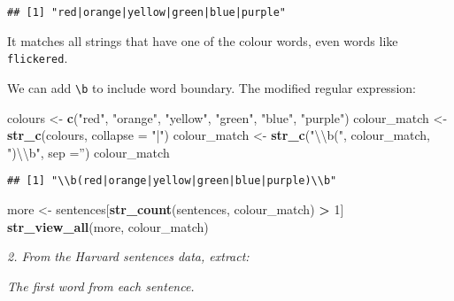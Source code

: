 \documentclass[]{article}
\newenvironment{Shaded}{\begin{snugshade}}{\end{snugshade}}
\newcommand{\KeywordTok}[1]{\textcolor[rgb]{0.13,0.29,0.53}{\textbf{#1}}}
\newcommand{\DataTypeTok}[1]{\textcolor[rgb]{0.13,0.29,0.53}{#1}}
\newcommand{\DecValTok}[1]{\textcolor[rgb]{0.00,0.00,0.81}{#1}}
\newcommand{\CharTok}[1]{\textcolor[rgb]{0.31,0.60,0.02}{#1}}
\newcommand{\StringTok}[1]{\textcolor[rgb]{0.31,0.60,0.02}{#1}}
\newcommand{\OperatorTok}[1]{\textcolor[rgb]{0.81,0.36,0.00}{\textbf{#1}}}
\newcommand{\NormalTok}[1]{#1}
\theoremstyle{definition}
\theoremstyle{definition}
\theoremstyle{definition}
\theoremstyle{remark}
\begin{document}
\begin{verbatim}
## [1] "red|orange|yellow|green|blue|purple"
\end{verbatim}

It matches all strings that have one of the colour words, even words
like \texttt{flickered}.

We can add \texttt{\textbackslash{}b} to include word boundary. The
modified regular expression:

\begin{Shaded}
\begin{Highlighting}[]
\NormalTok{colours <-}\StringTok{ }\KeywordTok{c}\NormalTok{(}\StringTok{"red"}\NormalTok{, }\StringTok{"orange"}\NormalTok{, }\StringTok{"yellow"}\NormalTok{, }\StringTok{"green"}\NormalTok{, }\StringTok{"blue"}\NormalTok{, }\StringTok{"purple"}\NormalTok{)}
\NormalTok{colour_match <-}\StringTok{ }\KeywordTok{str_c}\NormalTok{(colours, }\DataTypeTok{collapse =} \StringTok{"|"}\NormalTok{)}
\NormalTok{colour_match <-}\StringTok{ }\KeywordTok{str_c}\NormalTok{(}\StringTok{"}\CharTok{\textbackslash{}\textbackslash{}}\StringTok{b("}\NormalTok{, colour_match, }\StringTok{")}\CharTok{\textbackslash{}\textbackslash{}}\StringTok{b"}\NormalTok{, }\DataTypeTok{sep =}\StringTok{''}\NormalTok{)}
\NormalTok{colour_match}
\end{Highlighting}
\end{Shaded}

\begin{verbatim}
## [1] "\\b(red|orange|yellow|green|blue|purple)\\b"
\end{verbatim}

\begin{Shaded}
\begin{Highlighting}[]
\NormalTok{more <-}\StringTok{ }\NormalTok{sentences[}\KeywordTok{str_count}\NormalTok{(sentences, colour_match) }\OperatorTok{>}\StringTok{ }\DecValTok{1}\NormalTok{]}
\KeywordTok{str_view_all}\NormalTok{(more, colour_match)}
\end{Highlighting}
\end{Shaded}

\hypertarget{htmlwidget-dfc1d89b614d09b9064f}{}

\emph{2. From the Harvard sentences data, extract:}

\emph{The first word from each sentence.}

\begin{Shaded}
\end{Shaded}
\end{document}
